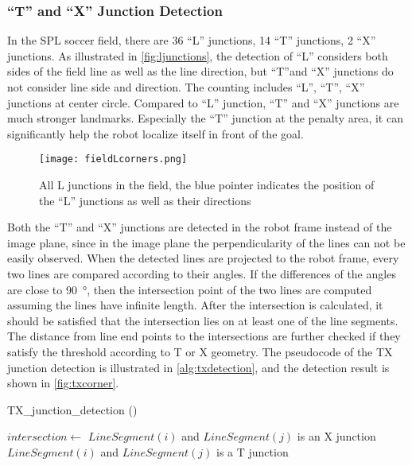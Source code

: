 \subsubsection{``T'' and ``X'' Junction Detection}
In the \gls{SPL} soccer field, there are 36 ``L'' junctions, 14 ``T'' junctions, 2 ``X'' junctions. As illustrated in \autoref{fig:ljunctions}, the detection of ``L'' considers both sides of the field line as well as the line direction, but ``T''and ``X'' junctions do not consider line side and direction. The counting includes ``L'', ``T'', ``X'' junctions at center circle. Compared to ``L'' junction, ``T'' and ``X'' junctions are much stronger landmarks. Especially the ``T'' junction at the penalty area, it can significantly help the robot localize itself in front of the goal.

\begin{figure}[h!]
  \centering
  \texttt{[image: fieldLcorners.png]}
  \caption[All L junctions in the field]{All L junctions in the field, the blue pointer indicates the position of the ``L'' junctions as well as their directions}
  \label{fig:ljunctions}
\end{figure}

Both the ``T'' and ``X'' junctions are detected in the robot frame instead of the image plane, since in the image plane the perpendicularity of the lines can not be easily observed. When the detected lines are projected to the robot frame, every two lines are compared according to their angles. If the differences of the angles are close to \SI{90}{\degree}, then the intersection point of the two lines are computed assuming the lines have infinite length. After the intersection is calculated, it should be satisfied that the intersection lies on at least one of the line segments. The distance from line end points to the intersections are further checked if they satisfy the threshold according to T or X geometry. The pseudocode of the TX junction detection is illustrated in \autoref{alg:txdetection}, and the detection result is shown in \autoref{fig:txcorner}.

\begin{algorithm}                      
  \caption{TX\_junction\_detection ()}         %
\label{alg:txdetection}                           
\begin{algorithmic}[1]                    
		\State $intersection \gets$ 
				\State $LineSegment(i)$ and $LineSegment(j)$ is an X junction
			\EndIf
				\State $LineSegment(i)$ and $LineSegment(j)$ is a T junction
			\EndIf
		    \EndIf
		\EndIf
	\EndFor
  \EndFor
\end{algorithmic}
\end{algorithm}

